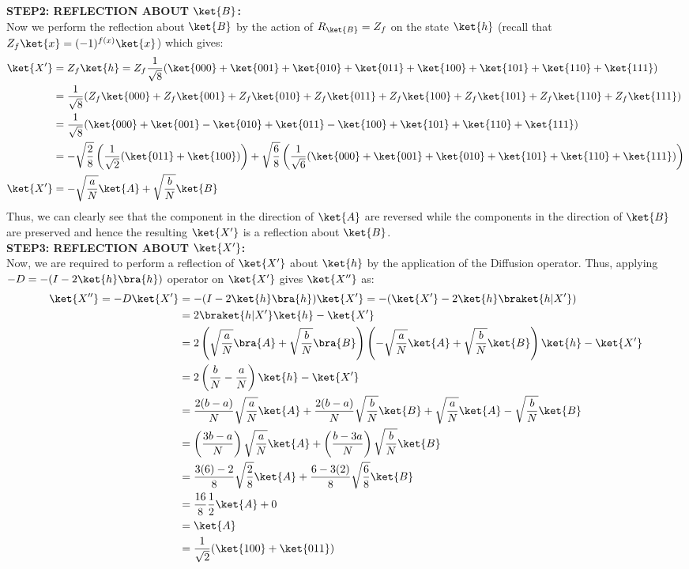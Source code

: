 \documentclass[12pt, oneside]{book}
\theoremstyle{definition}
\theoremstyle{definition}
\theoremstyle{remark}
\begin{document}
\textbf{STEP2: REFLECTION ABOUT $\ket{B}$: }\\
Now we perform the reflection about $\ket{B}$ by the action of $R_{\ket{B}}=Z_f$ on the state $\ket{h}$ (recall that $Z_f\ket{x}=(-1)^{f(x)}\ket{x}$) which gives:
\begin{align*}
\ket{X'}&=Z_f\ket{h}=Z_f\frac{1}{\sqrt{8}}(\ket{000}+\ket{001}+\ket{010}+\ket{011}+\ket{100}+\ket{101}+\ket{110}+\ket{111})\\
&=\frac{1}{\sqrt{8}}(Z_f\ket{000}+Z_f\ket{001}+Z_f\ket{010}+Z_f\ket{011}+Z_f\ket{100}+Z_f\ket{101}+Z_f\ket{110}+Z_f\ket{111})\\
&=\frac{1}{\sqrt{8}}(\ket{000}+\ket{001}-\ket{010}+\ket{011}-\ket{100}+\ket{101}+\ket{110}+\ket{111})\\
&=-\sqrt{\frac{2}{8}}\left(\frac{1}{\sqrt{2}}(\ket{011}+\ket{100})\right)+\sqrt{\frac{6}{8}}\left(\frac{1}{\sqrt{6}}(\ket{000}+\ket{001}+\ket{010}+\ket{101}+\ket{110}+\ket{111})\right)\\
\ket{X'}&=-\sqrt{\frac{a}{N}}\ket{A}+\sqrt{\frac{b}{N}}\ket{B}
\end{align*}
Thus, we can clearly see that the component in the direction of $\ket{A}$ are reversed while the components in the direction of $\ket{B}$ are preserved and hence the resulting $\ket{X'}$ is a reflection about $\ket{B}$.\\
\textbf{STEP3: REFLECTION ABOUT $\ket{X'}$: }\\
Now, we are required to perform a reflection of $\ket{X'}$ about $\ket{h}$ by the application of the Diffusion operator. Thus, applying $-D=-(I-2\ket{h}\bra{h})$ operator on $\ket{X'}$ gives $\ket{X''}$ as:
\begin{align*}
\ket{X''}=-D\ket{X'}&=-(I-2\ket{h}\bra{h})\ket{X'}=-(\ket{X'}-2\ket{h}\braket{h|X'})\\
&=2\braket{h|X'}\ket{h}-\ket{X'}\\
&=2\left(\sqrt{\frac{a}{N}}\bra{A}+\sqrt{\frac{b}{N}}\bra{B}\right)\left(-\sqrt{\frac{a}{N}}\ket{A}+\sqrt{\frac{b}{N}}\ket{B}\right)\ket{h}-\ket{X'}\\
&=2\left(\frac{b}{N}-\frac{a}{N}\right)\ket{h}-\ket{X'}\\
&=\frac{2(b-a)}{N} \sqrt{\frac{a}{N}} \ket{A} + \frac{2(b-a)}{N} \sqrt{\frac{b}{N}} \ket{B} + \sqrt{\frac{a}{N}}\ket{A}-\sqrt{\frac{b}{N}} \ket{B}\\
&=\left(\frac{3b-a}{N}\right)\sqrt{\frac{a}{N}}\ket{A}+\left(\frac{b-3a}{N}\right)\sqrt{\frac{b}{N}}\ket{B}\\
&=\frac{3(6)-2}{8}\sqrt{\frac{2}{8}}\ket{A}+\frac{6-3(2)}{8}\sqrt{\frac{6}{8}}\ket{B}\\
&=\frac{16}{8}\frac{1}{2}\ket{A}+0\\
&=\ket{A}\\
&=\frac{1}{\sqrt{2}}(\ket{100}+\ket{011})
\end{align*}
\end{document}
